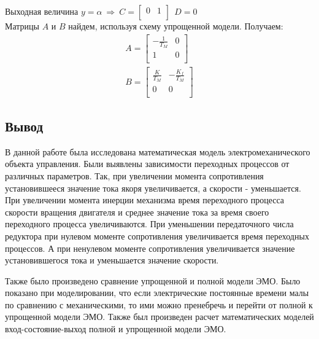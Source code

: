 \documentclass[a4paper,12pt]{article}
\begin{document}
		\noindent Выходная величина $y=\alpha ~\Rightarrow~ C=\begin{bmatrix}
		0 & 1\\ \end{bmatrix} ~~D=0$ \\
		Матрицы $A$ и $B$ найдем, используя схему упрощенной модели. Получаем:\\ 
		\begin{gather}
		\displaystyle A=\begin{bmatrix}
		-\frac{1}{T_M} & 0 \\
		1 & 0\\
		\end{bmatrix}\\ B=\begin{bmatrix}
		\frac{K}{T_M} & -\frac{K_f}{T_M} \\
		0 & 0 \\
		\end{bmatrix}
		\end{gather}
	\newpage
	\begin{center}
	\section*{Вывод} 
	\end{center}
	\par
	В данной работе была исследована математическая модель электромеханического объекта управления. Были выявлены зависимости переходных процессов от различных параметров. Так, при увеличении момента сопротивления установившееся значение тока якоря увеличивается, а скорости - уменьшается. При увеличении момента инерции механизма время переходного процесса скорости вращения двигателя и среднее значение тока за время своего переходного процесса увеличиваются. При уменьшении передаточного числа редуктора при нулевом моменте сопротивления увеличивается время переходных процессов. А при ненулевом моменте сопротивления увеличивается значение установившегося тока и уменьшается значение скорости. 
	\par
	Также было произведено сравнение упрощенной и полной модели ЭМО. Было показано при моделировании, что если электрические постоянные времени малы по сравнению с механическими, то ими можно пренебречь и перейти от полной к упрощенной модели ЭМО. Также был произведен расчет математических моделей вход-состояние-выход полной и упрощенной модели ЭМО. 





 
\end{document}
